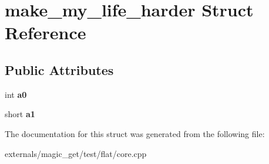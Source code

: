 \hypertarget{structmake__my__life__harder}{}\section{make\+\_\+my\+\_\+life\+\_\+harder Struct Reference}
\label{structmake__my__life__harder}
\subsection*{Public Attributes}
\begin{DoxyCompactItemize}
\item 
\mbox{\label{structmake__my__life__harder_a8f6cd4fd38ddfbf9ee7798d18d90803a}} 
int {\bfseries a0}
\item 
\mbox{\label{structmake__my__life__harder_aa02570c21fd062d601f662dc86081dd4}} 
short {\bfseries a1}
\end{DoxyCompactItemize}


The documentation for this struct was generated from the following file\+:\begin{DoxyCompactItemize}
\item 
externals/magic\+\_\+get/test/flat/core.\+cpp\end{DoxyCompactItemize}
